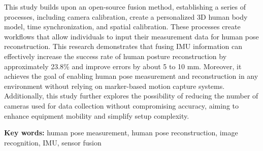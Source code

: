 This study builds upon an open-source fusion method, establishing a series of processes, including camera calibration, create a personalized 3D human body model, time synchronization, and spatial calibration. These processes create workflows that allow individuals to input their measurement data for human pose reconstruction. This research demonstrates that fusing IMU information can effectively increase the success rate of human posture reconstruction by approximately 23.8\% and improve errors by about 5 to 10 mm. Moreover, it achieves the goal of enabling human pose measurement and reconstruction in any environment without relying on marker-based motion capture systems. Additionally, this study further explores the possibility of reducing the number of cameras used for data collection without compromising accuracy, aiming to enhance equipment mobility and simplify setup complexity.

\bigskip
\textbf{Key words:} human pose measurement, human pose reconstruction, image recognition, IMU, sensor fusion
